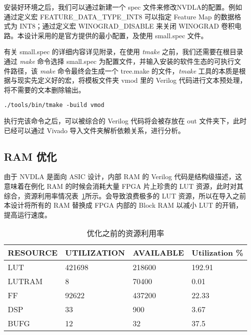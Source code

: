 安装好环境之后，我们可以通过新建一个 spec 文件来修改NVDLA的配置。例如通过定义宏 FEATURE\_DATA\_TYPE\_INT8 可以指定 Feature Map 的数据格式为 INT8；通过定义宏 WINOGRAD\_DISABLE 来关闭 WINOGRAD 卷积电路。本设计采用的是官方提供的最小配置，及使用 small.spec 文件。

有关 small.spec 的详细内容详见附录，在使用 \emph{tmake} 之前，我们还需要在根目录通过 \emph{make} 命令选择 small.spec 为配置文件，并输入安装的软件生态的可执行文件路径，该 \emph{make} 命令最终会生成一个 tree.make 的文件，\emph{tmake} 工具的本质是根据与现实先定义好的宏，将模板文件夹 vmod 里的 Verilog 代码进行文本预处理，将不需要的文本删除输出。

\begin{lstlisting}
./tools/bin/tmake -build vmod
\end{lstlisting}

执行完该命令之后，可以被综合的 Verilog 代码将会被存放在 out 文件夹下，此时已经可以通过 Vivado 导入文件夹解析依赖关系，进行分析。

\subsection{RAM 优化}

由于 NVDLA 是面向 ASIC 设计，内部 RAM 的 Verilog 代码是结构级描述，这意味着在例化 RAM 的时候会消耗大量 FPGA 片上珍贵的 LUT 资源，此时对其综合，资源利用率情况表~\ref{tab:Resource Report Before}所示。会导致浪费极多的 LUT 资源，所以在导入之前本设计将所有的 RAM 替换成 FPGA 内部的 Block RAM 以减小 LUT 的开销，提高运行速度。

\begin{table}[!htbp]
    \caption{优化之前的资源利用率}
    \label{tab:Resource Report Before}
    \centering
    \footnotesize%
    \setlength{\tabcolsep}{4pt}%
    \renewcommand{\arraystretch}{1.2}%
    \begin{tabular}{llll}
        \toprule
        \textbf{RESOURCE} & \textbf{UTILIZATION} & \textbf{AVAILABLE} & \textbf{Utilization \%} \\
        \midrule
        LUT               & 421698               & 218600               & 192.91                  \\
        LUTRAM            & 8                    & 70400                & 0.01                    \\
        FF                & 92622                & 437200               & 22.33                   \\
        DSP               & 33                   & 900                  & 3.67                    \\
        BUFG              & 12                   & 32                   & 37.5                    \\
        \bottomrule                   
    \end{tabular}
\end{table}

